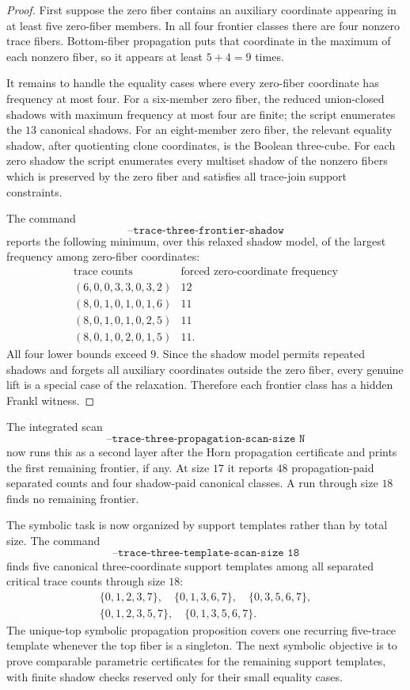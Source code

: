 \documentclass[11pt]{article}
\begin{document}
\begin{proof}
First suppose the zero fiber contains an auxiliary coordinate appearing in at
least five zero-fiber members.  In all four frontier classes there are four
nonzero trace fibers.  Bottom-fiber propagation puts that coordinate in the
maximum of each nonzero fiber, so it appears at least $5+4=9$ times.

It remains to handle the equality cases where every zero-fiber coordinate has
frequency at most four.  For a six-member zero fiber, the reduced
union-closed shadows with maximum frequency at most four are finite; the
script enumerates the $13$ canonical shadows.  For an eight-member zero
fiber, the relevant equality shadow, after quotienting clone coordinates, is
the Boolean three-cube.  For each zero shadow the script enumerates every
multiset shadow of the nonzero fibers which is preserved by the zero fiber
and satisfies all trace-join support constraints.

The command
\[
  \texttt{--trace-three-frontier-shadow}
\]
reports the following minimum, over this relaxed shadow model, of the largest
frequency among zero-fiber coordinates:
\[
\begin{array}{c|c}
\text{trace counts} & \text{forced zero-coordinate frequency}\\ \hline
(6,0,0,3,3,0,3,2) & 12\\
(8,0,1,0,1,0,1,6) & 11\\
(8,0,1,0,1,0,2,5) & 11\\
(8,0,1,0,2,0,1,5) & 11.
\end{array}
\]
All four lower bounds exceed $9$.  Since the shadow model permits repeated
shadows and forgets all auxiliary coordinates outside the zero fiber, every
genuine lift is a special case of the relaxation.  Therefore each frontier
class has a hidden Frankl witness.
\end{proof}

The integrated scan
\[
  \texttt{--trace-three-propagation-scan-size N}
\]
now runs this as a second layer after the Horn propagation certificate and
prints the first remaining frontier, if any.  At size $17$ it reports $48$
propagation-paid separated counts and four shadow-paid canonical classes.  A
run through size $18$ finds no remaining frontier.

The symbolic task is now organized by support templates rather than by total
size.  The command
\[
  \texttt{--trace-three-template-scan-size 18}
\]
finds five canonical three-coordinate support templates among all separated
critical trace counts through size $18$:
\[
\begin{gathered}
  \{0,1,2,3,7\},\quad
  \{0,1,3,6,7\},\quad
  \{0,3,5,6,7\},\\
  \{0,1,2,3,5,7\},\quad
  \{0,1,3,5,6,7\}.
\end{gathered}
\]
The unique-top symbolic propagation proposition covers one recurring
five-trace template whenever the top fiber is a singleton.  The next
symbolic objective is to prove comparable parametric certificates for the
remaining support templates, with finite shadow checks reserved only for
their small equality cases.
\end{document}
